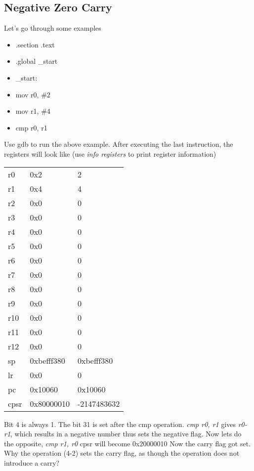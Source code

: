 \documentclass{article}
\begin{document}
	\subsection{Negative Zero Carry}
	Let's go through some examples
	\begin{itemize}
		\item[] .section .text
		\item[] .global \_start
		\item[] \_start:
		\item[]\qquad mov r0, \#2
		\item[]\qquad mov r1, \#4
		\item[]\qquad cmp r0, r1
	\end{itemize}
	Use gdb to run the above example. After executing the last instruction, the registers will look like (use \textit{info registers} to print register information)\newline
	\begin{tabular}{l l l}
		r0 & 0x2	& 2 \\
		r1 & 0x4	&	4 \\
		r2 & 0x0	&	0 \\
		r3 & 0x0	&	0 \\
		r4 & 0x0	&	0 \\
		r5 & 0x0	&	0 \\
		r6 & 0x0	&	0 \\
		r7 & 0x0	&	0 \\
		r8 & 0x0	&	0 \\
		r9 & 0x0	&	0 \\
		r10 & 0x0	&	0 \\
		r11 & 0x0	&	0 \\
		r12 & 0x0	&	0 \\
		sp & 0xbefff380 	& 0xbefff380 \\
		lr & 0x0	&	0 \\
		pc & 0x10060	&	0x10060 \\
		cpsr & 0x80000010	&	-2147483632
	\end{tabular}
	\newline
	Bit 4 is always 1. The bit 31 is set after the cmp operation. \textit{cmp r0, r1} gives \textit{r0-r1}, which results in a negative number thus sets the negative flag.\newline
	Now lets do the opposite, \textit{cmp r1, r0}\newline
	cpsr will become 0x20000010\newline
	Now the carry flag got set. Why the operation (4-2) sets the carry flag, as though the operation does not introduce a carry?\newline
\end{document}
